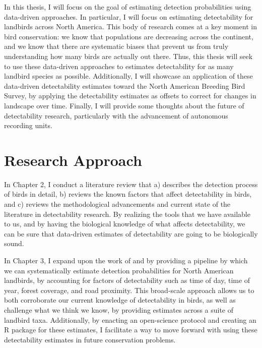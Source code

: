 \par In this thesis, I will focus on the goal of estimating detection probabilities using data-driven approaches.
In particular, I will focus on estimating detectability for landbirds across North America.
This body of research comes at a key moment in bird conservation: we know that populations are decreasing across the continent, and we know that there are systematic biases that prevent us from truly understanding how many birds are actually out there.
Thus, this thesis will seek to use these data-driven approaches to estimates detectability for as many landbird species as possible.
Additionally, I will showcase an application of these data-driven detectability estimates toward the North American Breeding Bird Survey, by applying the detectability estimates as offsets to correct for changes in landscape over time.
Finally, I will provide some thoughts about the future of detectability research, particularly with the advancement of autonomous recording units.

\section{Research Approach}

\par In Chapter 2, I conduct a literature review that a) describes the detection process of birds in detail, b) reviews the known factors that affect detectability in birds, and c) reviews the methodological advancements and current state of the literature in detectability research.
By realizing the tools that we have available to us, and by having the biological knowledge of what affects detectability, we can be sure that data-driven estimates of detectability are going to be biologically sound.

\par In Chapter 3, I expand upon the work of \citet{solymos_calibrating_2013} and \citet{solymos_evaluating_2018} by providing a pipeline by which we can systematically estimate detection probabilities for North American landbirds, by accounting for factors of detectability such as time of day, time of year, forest coverage, and road proximity.
This broad-scale approach allows us to both corroborate our current knowledge of detectability in birds, as well as challenge what we think we know, by providing estimates across a suite of landbird taxa.
Additionally, by enacting an open-science protocol and creating an R package for these estimates, I facilitate a way to move forward with using these detectability estimates in future conservation problems.

